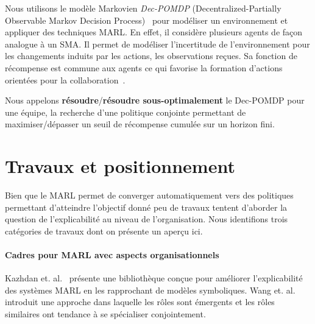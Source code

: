 \documentclass[demonstration]{jfsma}
\newcommand{\probP}{\text{I\kern-0.15em P}}
\begin{document}
Nous utilisons le modèle Markovien \emph{Dec-POMDP} (Decentralized-Partially Observable Markov Decision Process)~\cite{Oliehoek2016} pour modéliser un environnement et appliquer des techniques MARL. En effet, il considère plusieurs agents de façon analogue à un SMA. Il permet de modéliser l'incertitude de l'environnement pour les changements induits par les actions, les observations reçues. Sa fonction de récompense est commune aux agents ce qui favorise la formation d'actions orientées pour la collaboration~\cite{Beynier2013}.

Nous appelons \textbf{résoudre}/\textbf{résoudre sous-optimalement} le Dec-POMDP pour une équipe, la recherche d'une politique conjointe permettant de maximiser/dépasser un seuil de récompense cumulée sur un horizon fini.


\section{Travaux et positionnement}

Bien que le MARL permet de converger automatiquement vers des politiques permettant d'atteindre l'objectif donné peu de travaux tentent d’aborder la question de l'explicabilité au niveau de l'organisation. Nous identifions trois catégories de travaux dont on présente un aperçu ici.

\paragraph{\textbf{Cadres pour MARL avec aspects organisationnels}}
%
Kazhdan et. al.~\cite{Kazhdan2020} présente une bibliothèque conçue pour améliorer l'explicabilité des systèmes MARL en les rapprochant de modèles symboliques.
%
Wang et. al.~\cite{Wang2020} introduit une approche dans laquelle les rôles sont émergents et les rôles similaires ont tendance à se spécialiser conjointement.
%
%
\end{document}
